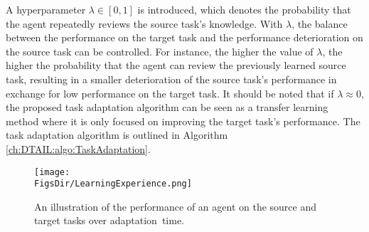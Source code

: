     A hyperparameter $\lambda \in [0, 1]$ is introduced, which denotes the probability that the agent repeatedly reviews the source task's knowledge.
    With $\lambda$,
    the balance between the performance on the target task and the performance deterioration on the source task can be controlled.
    For instance,
    the higher the value of $\lambda$,
    the higher the probability that the agent can review the previously learned source task,
    resulting in a smaller deterioration of the source task's performance in exchange for low performance on the target task.
    It should be noted that if $\lambda \approx 0$,
the proposed task adaptation algorithm can be seen as a transfer learning method where it is only focused on improving the target task's performance.
The task adaptation algorithm is outlined in Algorithm \ref{ch:DTAIL:algo:TaskAdaptation}.



\begin{figure}[htbp!]
  \centering
  \texttt{[image: \\FigsDir/LearningExperience.png]}
  \caption{An illustration of the performance of an agent on the source and target tasks over \mbox{adaptation time}.\label{ch:DTAIL:fig:LearningExperience}}
\end{figure}

